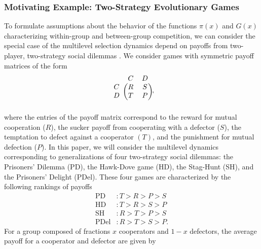 \documentclass[11pt]{article}
\numberwithin{equation}{section}
\begin{document}
{\subsubsection{Motivating Example: Two-Strategy Evolutionary Games}
\label{sec:gamemotivation}

To formulate assumptions about the behavior of the functions $\pi(x)$ and $G(x)$ characterizing within-group and between-group competition,%
 we can consider the special case of the multilevel selection dynamics depend on payoffs from two-player, two-strategy social dilemmas \cite{cooney2019replicator,cooney2020analysis}. We consider games with symmetric payoff matrices of the form 
\begin{equation} \label{eq:payoffmatrix}
\begin{blockarray}{ccc}
& C & D \\
\begin{block}{c(cc)}
C & R & S \\
D & T & P \\
\end{block}
\end{blockarray},
\end{equation}
where the entries of the payoff matrix correspond to the reward for mutual cooperation ($R$), the sucker payoff from cooperating with a defector ($S$), the temptation to defect against a cooperator $(T)$, and the punishment for mutual defection ($P$). In this paper, we will consider the multilevel dynamics corresponding to generalizations of four two-strategy social dilemmas: the Prisoners' Dilemma (PD), the Hawk-Dove game (HD), the Stag-Hunt (SH), and the Prisoners' Delight (PDel). These four games are characterized by the following rankings of payoffs
\begin{subequations} \label{eq:payoffrankings}
\begin{align}
    \mathrm{PD} &: T > R > P > S \label{eq:PDpayoffs} \\
    \mathrm{HD} &: T > R > S > P \label{eq:HDpayoffs} \\
    \mathrm{SH} &: R > T > P > S \label{eq:SHpayoffs} \\
    \mathrm{PDel} &: R > T > S > P \label{eq:PDelpayoffs}.
\end{align}
\end{subequations}
For a group composed of fractions $x$ cooperators and $1-x$ defectors, the average payoff for a cooperator and defector are given by 
\begin{subequations} \label{eq:gamepayoffs}
\begin{align}

\end{align}
\end{subequations}}
\end{document}
